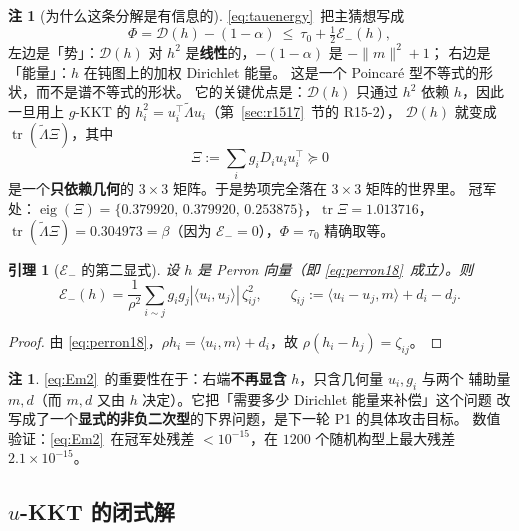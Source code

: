 \documentclass[UTF8,11pt]{ctexart}
\newtheorem{lemma}[theorem]{引理}
\theoremstyle{definition}
\newtheorem{remark}[theorem]{注}
\newcommand{\Lam}{\Lambda}
\newcommand{\tr}{\operatorname{tr}}
\begin{document}
\begin{remark}[为什么这条分解是有信息的]\label{rmk:dilread}
\eqref{eq:tauenergy}~把主猜想写成
\begin{equation}\label{eq:star}
\Phi=\mathcal D(h)-(1-\alpha)\ \le\ \tau_0+\tfrac12\mathcal E_-(h),
\end{equation}
左边是「势」：$\mathcal D(h)$ 对 $h^2$ 是\textbf{线性}的，$-(1-\alpha)$ 是 $-\|m\|^2+1$；
右边是「能量」：$h$ 在钝图上的加权 Dirichlet 能量。
这是一个 Poincar\'e 型不等式的形状，而不是谱不等式的形状。
它的关键优点是：$\mathcal D(h)$ 只通过 $h^2$ 依赖 $h$，因此一旦用上
$g$-KKT 的 $h_i^2=u_i^\top\tilde\Lam u_i$（第~\ref{sec:r1517}~节的 R15-2），
$\mathcal D(h)$ 就变成 $\tr(\tilde\Lam\Xi)$，其中
\begin{equation}\label{eq:Xidef}
\Xi:=\sum_ig_iD_iu_iu_i^\top\succeq0
\end{equation}
是一个\textbf{只依赖几何}的 $3\times3$ 矩阵。于是势项完全落在 $3\times3$ 矩阵的世界里。
冠军处：$\operatorname{eig}(\Xi)=\{0.379920,\,0.379920,\,0.253875\}$，$\tr\Xi=1.013716$，
$\tr(\tilde\Lam\Xi)=0.304973=\beta$（因为 $\mathcal E_-=0$），$\Phi=\tau_0$ 精确取等。
\end{remark}

\begin{lemma}[$\mathcal E_-$ 的第二显式]\label{lem:Em2}
设 $h$ 是 Perron 向量（即 \eqref{eq:perron18}~成立）。则
\begin{equation}\label{eq:Em2}
\mathcal E_-(h)=\frac1{\rho^2}\sum_{i\sim j}g_ig_j|\langle u_i,u_j\rangle|\,
\zeta_{ij}^2,\qquad
\zeta_{ij}:=\langle u_i-u_j,m\rangle+d_i-d_j .
\end{equation}
\end{lemma}

\begin{proof}
由 \eqref{eq:perron18}，$\rho h_i=\langle u_i,m\rangle+d_i$，故 $\rho(h_i-h_j)=\zeta_{ij}$。
\end{proof}

\begin{remark}\label{rmk:Em2read}
\eqref{eq:Em2}~的重要性在于：右端\textbf{不再显含} $h$，只含几何量 $u_i,g_i$ 与两个
辅助量 $m,d$（而 $m,d$ 又由 $h$ 决定）。它把「需要多少 Dirichlet 能量来补偿」这个问题
改写成了一个\textbf{显式的非负二次型}的下界问题，是下一轮 P1 的具体攻击目标。
数值验证：\eqref{eq:Em2}~在冠军处残差 $<10^{-15}$，在 $1200$ 个随机构型上最大残差 $2.1\times10^{-15}$。
\end{remark}

\subsection{$u$-KKT 的闭式解}\label{sec:r18:ukkt}
\end{document}
